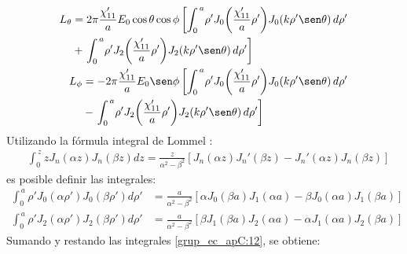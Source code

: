\begin{subequations}
\label{grup_ec_apC:11}
\begin{align}
\begin{split}
L_{\theta} &= 2\pi\frac{\chi '_{11}}{a}E_0\cos\theta\cos\phi\left[\int_{0}^{\,a}\!\rho 'J_0\!\left(\frac{\chi '_{11}}{a}\rho '\right)\!J_0\!\left(k\rho '\sen\theta\right)d\rho '\right.\\
&+\left.\int_{0}^{\,a}\!\rho 'J_2\!\left(\frac{\chi '_{11}}{a}\rho '\right)\!J_2\!\left(k\rho '\sen\theta\right)d\rho '\right]
\end{split}
\label{ec_apC:49}\\
\begin{split}
L_{\phi} &= - 2\pi\frac{\chi '_{11}}{a}E_0\sen\phi\left[\int_{0}^{\,a}\!\rho 'J_0\!\left(\frac{\chi '_{11}}{a}\rho '\right)\!J_0\!\left(k\rho '\sen\theta\right)d\rho '\right.\\
&-\left.\int_{0}^{\,a}\!\rho 'J_2\!\left(\frac{\chi '_{11}}{a}\rho '\right)\!J_2\!\left(k\rho '\sen\theta\right)d\rho '\right]
\end{split}
\label{ec_apC:50}
\end{align}
\end{subequations}
Utilizando la fórmula integral de Lommel \cite{walfram_bessel_first}:
\begin{align}
&\int_{0}^{\,z}\!zJ_n\!\left(\alpha z\right)\!J_n\!\left(\beta z\right)dz = \frac{z}{\alpha^2 - \beta^2}\left[J_n\!\left(\alpha z\right)\!{J_n}'\!\left(\beta z\right) - {J_n}'\!\left(\alpha z\right)\!J_n\!\left(\beta z\right)\right]
\label{ec_apC:51}
\end{align}
es posible definir las integrales:
\begin{subequations}
\label{grup_ec_apC:12}
\begin{align}
\int_{0}^{\,a}\!\rho 'J_0\!\left(\alpha\rho '\right)\!J_0\!\left(\beta\rho '\right)d\rho ' &= \frac{a}{\alpha^2 - \beta^2}\left[\alpha J_0\!\left(\beta a\right)\!J_1\!\left(\alpha a\right) - \beta J_0\!\left(\alpha a\right)\!J_1\!\left(\beta a\right)\right]
\label{ec_apC:52}\\
\int_{0}^{\,a}\!\rho 'J_2\!\left(\alpha\rho '\right)\!J_2\!\left(\beta\rho '\right)d\rho ' &= \frac{a}{\alpha^2 - \beta^2}\left[\beta J_1\!\left(\beta a\right)\!J_2\!\left(\alpha a\right) - \alpha J_1\!\left(\alpha a\right)\!J_2\!\left(\beta a\right)\right]
\label{ec_apC:53}
\end{align}
\end{subequations}
Sumando y restando las integrales \eqref{grup_ec_apC:12}, se obtiene:
